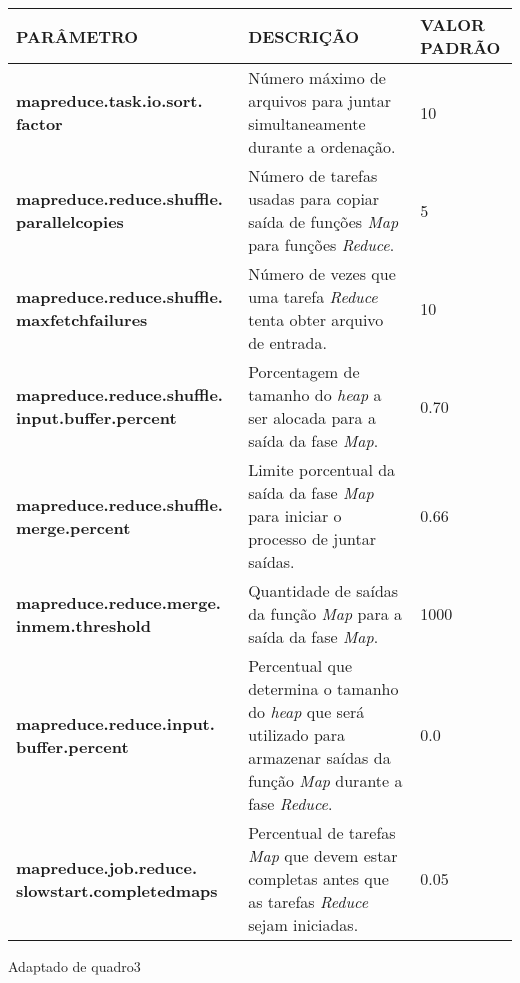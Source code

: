 {\footnotesize
  \centering
  \begin{tabular}{|p{40mm}|p{50mm}|p{30mm}|}\hline
    \textbf{PARÂMETRO}                                      & \textbf{DESCRIÇÃO}                                                                                                                                        & \textbf{VALOR PADRÃO} \\\hline
    \textbf{mapreduce.task.io.sort. factor}                 & Número máximo de arquivos para juntar simultaneamente durante a ordenação.                                                                                & 10                    \\\hline
    \textbf{mapreduce.reduce.shuffle. parallelcopies}       & Número de tarefas usadas para copiar saída de funções \textit{Map} para funções \textit{Reduce}.                                                          & 5                     \\\hline
    \textbf{mapreduce.reduce.shuffle. maxfetchfailures}     & Número de vezes que uma tarefa \textit{Reduce} tenta obter arquivo de entrada.                                                                            & 10                    \\\hline
    \textbf{mapreduce.reduce.shuffle. input.buffer.percent} & Porcentagem de tamanho do \textit{\gls{heap}} a ser alocada para a saída da fase \textit{Map}.                                                            & 0.70                  \\\hline
    \textbf{mapreduce.reduce.shuffle. merge.percent}        & Limite porcentual da saída da fase \textit{Map} para iniciar o processo de juntar saídas.                                                                 & 0.66                  \\\hline
    \textbf{mapreduce.reduce.merge. inmem.threshold}        & Quantidade de saídas da função \textit{Map} para a saída da fase \textit{Map}.                                                                            & 1000                  \\\hline
    \textbf{mapreduce.reduce.input. buffer.percent}         & Percentual que determina o tamanho do \textit{\gls{heap}} que será utilizado para armazenar saídas da função \textit{Map} durante a fase \textit{Reduce}. & 0.0                   \\\hline
    \textbf{mapreduce.job.reduce. slowstart.completedmaps}  & Percentual de tarefas \textit{Map} que devem estar completas antes que as tarefas \textit{Reduce} sejam iniciadas.                                        & 0.05                  \\\hline
  \end{tabular}}
{Adaptado de \cite{HadoopDocs321}}{quadro3}{}{}

